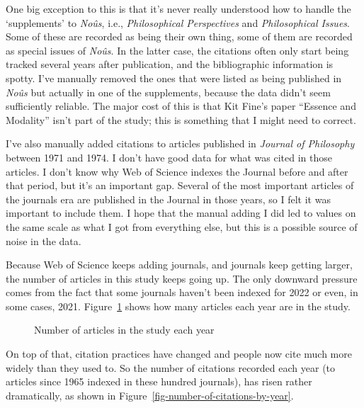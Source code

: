 \documentclass[
  10pt,
  letterpaper,
  DIV=11,
  numbers=noendperiod,
  twoside]{scrartcl}
\begin{document}
One big exception to this is that it's never really understood how to
handle the `supplements' to \emph{Noûs}, i.e., \emph{Philosophical
Perspectives} and \emph{Philosophical Issues}. Some of these are
recorded as being their own thing, some of them are recorded as special
issues of \emph{Noûs}. In the latter case, the citations often only
start being tracked several years after publication, and the
bibliographic information is spotty. I've manually removed the ones that
were listed as being published in \emph{Noûs} but actually in one of the
supplements, because the data didn't seem sufficiently reliable. The
major cost of this is that Kit Fine's paper ``Essence and Modality''
isn't part of the study; this is something that I might need to correct.

I've also manually added citations to articles published in
\emph{Journal of Philosophy} between 1971 and 1974. I don't have good
data for what was cited in those articles. I don't know why Web of
Science indexes the Journal before and after that period, but it's an
important gap. Several of the most important articles of the journals
era are published in the Journal in those years, so I felt it was
important to include them. I hope that the manual adding I did led to
values on the same scale as what I got from everything else, but this is
a possible source of noise in the data.

Because Web of Science keeps adding journals, and journals keep getting
larger, the number of articles in this study keeps going up. The only
downward pressure comes from the fact that some journals haven't been
indexed for 2022 or even, in some cases, 2021.
Figure~\ref{fig-number-of-articles-by-year} shows how many articles each
year are in the study.

\begin{figure}


\caption{\label{fig-number-of-articles-by-year}Number of articles in the
study each year}

\end{figure}%

On top of that, citation practices have changed and people now cite much
more widely than they used to. So the number of citations recorded each
year (to articles since 1965 indexed in these hundred journals), has
risen rather dramatically, as shown in
Figure~\ref{fig-number-of-citations-by-year}.
\end{document}

